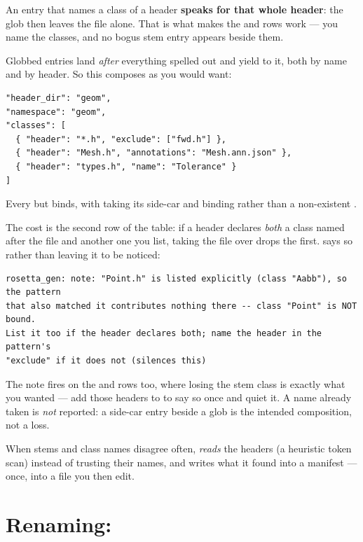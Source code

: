 An entry that names a class of a header \textbf{speaks for that whole header}:
the glob then leaves the file alone. That is what makes the  and
 rows work --- you name the classes, and no bogus stem entry
appears beside them.

Globbed entries land \emph{after} everything spelled out and yield to it, both
by name and by header. So this composes as you would want:

\begin{lstlisting}[style=json]
"header_dir": "geom",
"namespace": "geom",
"classes": [
  { "header": "*.h", "exclude": ["fwd.h"] },
  { "header": "Mesh.h", "annotations": "Mesh.ann.json" },
  { "header": "types.h", "name": "Tolerance" }
]
\end{lstlisting}

Every  but  binds, with 
taking its side-car and  binding 
rather than a non-existent .

The cost is the second row of the table: if a header declares \emph{both} a
class named after the file and another one you list, taking the file over drops
the first.  says so rather than leaving it to be noticed:

\begin{lstlisting}[style=plain]
rosetta_gen: note: "Point.h" is listed explicitly (class "Aabb"), so the pattern
that also matched it contributes nothing there -- class "Point" is NOT bound.
List it too if the header declares both; name the header in the pattern's
"exclude" if it does not (silences this)
\end{lstlisting}

The note fires on the  and  rows too, where losing
the stem class is exactly what you wanted --- add those headers to
 to say so once and quiet it. A name already taken is \emph{not}
reported: a side-car entry beside a glob is the intended composition, not a
loss.

\begin{note}
When stems and class names disagree often, 
\emph{reads} the headers (a heuristic token scan) instead of trusting their
names, and writes what it found into a manifest --- once, into a file you then
edit.
\end{note}

\section{Renaming: }
\label{sec:expose}

